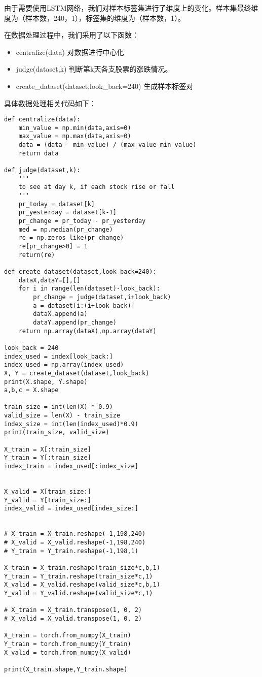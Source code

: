 \documentclass[addpoints,answers]{exam}
\begin{document}
由于需要使用LSTM网络，我们对样本标签集进行了维度上的变化。样本集最终维度为（样本数，240，1），标签集的维度为（样本数，1）。

在数据处理过程中，我们采用了以下函数：
\begin{itemize}
    \item centralize(data)
    对数据进行中心化
    \item judge(dataset,k)
    判断第k天各支股票的涨跌情况。
    \item create\_dataset(dataset,look\_back=240)
    生成样本标签对
\end{itemize}

具体数据处理相关代码如下：
\begin{lstlisting}
def centralize(data):
    min_value = np.min(data,axis=0)
    max_value = np.max(data,axis=0)
    data = (data - min_value) / (max_value-min_value)
    return data

def judge(dataset,k):
    '''
    to see at day k, if each stock rise or fall
    '''
    pr_today = dataset[k]
    pr_yesterday = dataset[k-1]
    pr_change = pr_today - pr_yesterday
    med = np.median(pr_change)
    re = np.zeros_like(pr_change)
    re[pr_change>0] = 1
    return(re)

def create_dataset(dataset,look_back=240):
    dataX,dataY=[],[]
    for i in range(len(dataset)-look_back):
        pr_change = judge(dataset,i+look_back)
        a = dataset[i:(i+look_back)]
        dataX.append(a)
        dataY.append(pr_change)
    return np.array(dataX),np.array(dataY)

look_back = 240
index_used = index[look_back:]
index_used = np.array(index_used)
X, Y = create_dataset(dataset,look_back)
print(X.shape, Y.shape)
a,b,c = X.shape

train_size = int(len(X) * 0.9)
valid_size = len(X) - train_size
index_size = int(len(index_used)*0.9)
print(train_size, valid_size)

X_train = X[:train_size]
Y_train = Y[:train_size]
index_train = index_used[:index_size]


X_valid = X[train_size:]
Y_valid = Y[train_size:]
index_valid = index_used[index_size:]


# X_train = X_train.reshape(-1,198,240)
# X_valid = X_valid.reshape(-1,198,240)
# Y_train = Y_train.reshape(-1,198,1)

X_train = X_train.reshape(train_size*c,b,1)
Y_train = Y_train.reshape(train_size*c,1)
X_valid = X_valid.reshape(valid_size*c,b,1)
Y_valid = Y_valid.reshape(valid_size*c,1)

# X_train = X_train.transpose(1, 0, 2)
# X_valid = X_valid.transpose(1, 0, 2)

X_train = torch.from_numpy(X_train)
Y_train = torch.from_numpy(Y_train)
X_valid = torch.from_numpy(X_valid)

print(X_train.shape,Y_train.shape)
\end{lstlisting}
\end{document}
